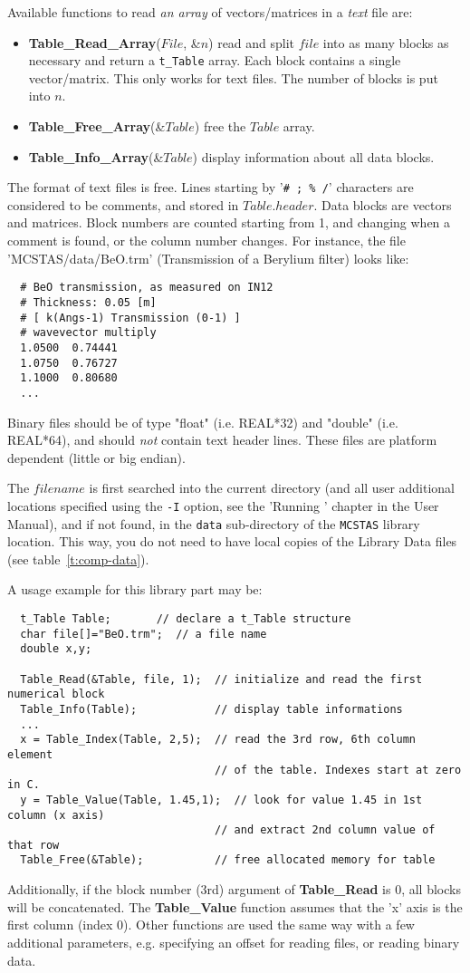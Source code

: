 Available functions to read \emph{an array} of vectors/matrices in a \emph{text} file are:
\begin{itemize}
\item \textbf{Table\_Read\_Array}($File$, \&$n$) read and split $file$
into as many blocks as necessary and return a \verb+t_Table+ array.
Each block contains a single vector/matrix. This only works for text files.
The number of blocks is put into $n$.
\item \textbf{Table\_Free\_Array}(\&$Table$) free the $Table$ array.
\item \textbf{Table\_Info\_Array}(\&$Table$) display information about all data blocks.
\end{itemize}

The format of text files is free. Lines starting by '\verb+# ; % /+' characters are considered to be comments, and stored in $Table.header$. Data blocks are vectors and matrices. Block numbers are counted starting from 1, and changing when a comment is found, or the column number changes. For instance, the file 'MCSTAS/data/BeO.trm' (Transmission of a Berylium filter) looks like:
\begin{lstlisting}
  # BeO transmission, as measured on IN12
  # Thickness: 0.05 [m]
  # [ k(Angs-1) Transmission (0-1) ]
  # wavevector multiply
  1.0500  0.74441
  1.0750  0.76727
  1.1000  0.80680
  ...
\end{lstlisting}
Binary files should be of type "float" (i.e. REAL*32) and "double" (i.e. REAL*64),
and should \emph{not} contain text header lines. These files are platform
dependent (little or big endian).

The $filename$ is first searched into the current directory (and all user additional locations specified using the \verb+-I+ option, see the 'Running \MCS ' chapter in the User Manual), and if not found, in the \verb+data+ sub-directory of the \verb+MCSTAS+ library location. 
 This way, you do not need to have local copies of the \MCS Library Data files (see table~\ref{t:comp-data}).

A usage example for this library part may be:
\begin{lstlisting}
  t_Table Table;       // declare a t_Table structure
  char file[]="BeO.trm";  // a file name
  double x,y;

  Table_Read(&Table, file, 1);  // initialize and read the first numerical block
  Table_Info(Table);            // display table informations
  ...
  x = Table_Index(Table, 2,5);  // read the 3rd row, 6th column element
                                // of the table. Indexes start at zero in C.
  y = Table_Value(Table, 1.45,1);  // look for value 1.45 in 1st column (x axis)
                                // and extract 2nd column value of that row
  Table_Free(&Table);           // free allocated memory for table
\end{lstlisting}
Additionally, if the block number (3rd) argument of  \textbf{Table\_Read} is 0, all blocks will be concatenated.
The \textbf{Table\_Value} function assumes that the 'x' axis is the first column (index 0).
Other functions are used the same way with a few additional parameters, e.g. specifying an offset for reading files, or reading binary data.

